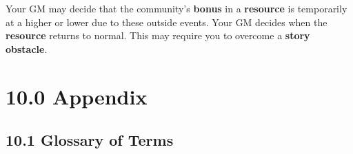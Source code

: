 \documentclass[
  11pt,
]{article}
\begin{document}
Your GM may decide that the community's \textbf{bonus} in a
\textbf{resource} is temporarily at a higher or lower due to these
outside events. Your GM decides when the \textbf{resource} returns to
normal. This may require you to overcome a \textbf{story obstacle}.

\hypertarget{appendix}{%
\section{10.0 Appendix}\label{appendix}}

\hypertarget{glossary-of-terms}{%
\subsection{10.1 Glossary of Terms}\label{glossary-of-terms}}
\end{document}
